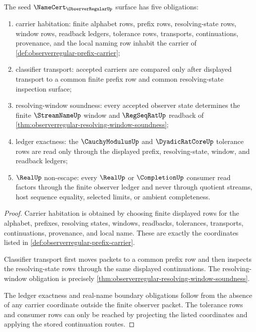 \begin{theorem}
\label{thm:observerregular-namecert-obligations}
The seed $\NameCert_{\ObserverRegularUp}$ surface has five obligations:
\begin{enumerate}
\item carrier habitation: finite alphabet rows, prefix rows, resolving-state rows, window rows, readback ledgers, tolerance rows, transports, continuations, provenance, and the local naming row inhabit the carrier of \autoref{def:observerregular-prefix-carrier};
\item classifier transport: accepted carriers are compared only after displayed transport to a common finite prefix row and common resolving-state inspection surface;
\item resolving-window soundness: every accepted observer state determines the finite $\StreamNameUp$ window and $\RegSeqRatUp$ readback of \autoref{thm:observerregular-resolving-window-soundness};
\item ledger exactness: the $\CauchyModulusUp$ and $\DyadicRatCoreUp$ tolerance rows are read only through the displayed prefix, resolving-state, window, and readback ledgers;
\item $\RealUp$ non-escape: every $\RealUp$ or $\CompletionUp$ consumer read factors through the finite observer ledger and never through quotient streams, host sequence equality, selected limits, or ambient completeness.
\end{enumerate}
\end{theorem}
\begin{proof}
Carrier habitation is obtained by choosing finite displayed rows for the alphabet, prefixes, resolving states, windows, readbacks, tolerances, transports, continuations, provenance, and local name. These are exactly the coordinates listed in \autoref{def:observerregular-prefix-carrier}.

Classifier transport first moves packets to a common prefix row and then inspects the resolving-state rows through the same displayed continuations. The resolving-window obligation is precisely \autoref{thm:observerregular-resolving-window-soundness}.

The ledger exactness and real-name boundary obligations follow from the absence of any carrier coordinate outside the finite observer packet. The tolerance rows and consumer rows can only be reached by projecting the listed coordinates and applying the stored continuation routes.
\end{proof}

